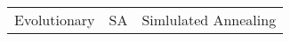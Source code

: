 \documentclass[twoside,a4paper,10pt]{article}
\begin{document}
\begin{tabular}{|p{3cm}|c|c|}
Evolutionary & SA & Simlulated Annealing \\ 
\end{tabular}
\end{document}
